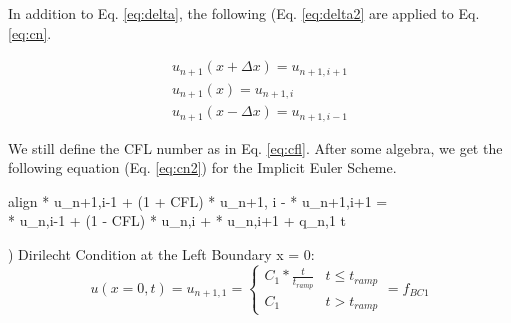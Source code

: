 \documentclass[10pt, letter, showtrims]{extarticle}
\newcommand{\boxedeq}[2]{\begin{empheq}[box={\fboxsep=6pt\fbox}]{align}\label{#1}#2\end{empheq}}
\begin{document}
%		
		
		\noindent
		In addition to Eq. \ref{eq:delta}, the following (Eq. \ref{eq:delta2} are applied to Eq. \ref{eq:cn}.
		
		\begin{equation}
		\label{eq:delta2}
			\begin{split}
				u_{n+1}(x + \Delta x) = u_{n+1,i+1} \\
				u_{n+1}(x)            = u_{n+1,i} \\
				u_{n+1}(x - \Delta x) = u_{n+1,i-1}
			\end{split}
		\end{equation}
		
		\noindent
		We still define the CFL number as in Eq. \ref{eq:cfl}. After some algebra, we get the following equation (Eq. \ref{eq:cn2}) for the Implicit Euler Scheme.
		
%		
%		
		
		\boxedeq{eq:cn2}{ * u_{n+1,i-1} + (1 + CFL) * u_{n+1, i} - \frac{-CFL}{2} * u_{n+1,i+1} = \\ \frac{CFL}{2} * u_{n,i-1} + (1 - CFL) * u_{n,i} + \frac{CFL}{2} * u_{n,i+1} + q_{n,1} \Delta t}
		
		
		) Dirilecht Condition at the Left Boundary x = 0:	\\
		
		\begin{equation}
			u(x=0, t) = u_{n+1, 1} = \begin{cases} 
          					C_{1} * \frac{t}{t_{ramp}} & t\leq t_{ramp} \\
          					C_{1}                      & t > t_{ramp}
       					\end{cases} = f_{BC1}
    		\end{equation}  		
\end{document}
